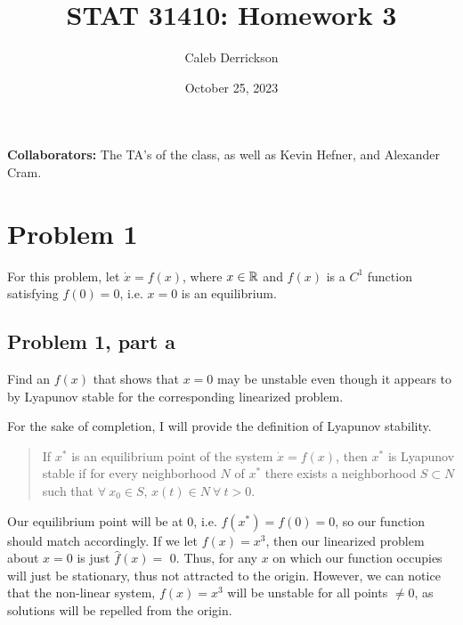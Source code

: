 

\title{STAT 31410: Homework 3}
\author{Caleb Derrickson}
\date{October 25, 2023}


\onehalfspacing
\maketitle

{\color{cit}\vspace{2mm}\noindent\textbf{Collaborators:}} The TA's of the class, as well as Kevin Hefner, and Alexander Cram.

\tableofcontents

\newpage
\section{Problem 1}
For this problem, let $\dot{x} = f(x)$, where $x \in \mathbb{R}$ and $f(x)$ is a $C^1$ function satisfying $f(0) = 0$, i.e. $x = 0$ is an equilibrium. 

\subsection{Problem 1, part a}
Find an $f(x)$ that shows that $x = 0$ may be unstable even though it appears to by Lyapunov stable for the corresponding linearized problem.

\partbreak
\begin{solution}

    For the sake of completion, I will provide the definition of Lyapunov stability.

    \alignbreak
    \vspace{-8mm}
    \begin{quote}
        If $x^*$ is an equilibrium point of the system $\dot{x} = f(x)$, then $x^*$ is Lyapunov stable if for every neighborhood $N$ of $x^*$ there exists a neighborhood $S\subset N$ such that $\forall \ x_0 \in S$, $x(t) \in N \ \forall \ t > 0$.   
    \end{quote}
    \vspace{-8mm}
    \alignbreak

    Our equilibrium point will be at 0, i.e. $f(x^*) = f(0) = 0$, so our function should match accordingly. If we let $f(x) = x^3$, then our linearized problem about $x = 0$ is just $\hat{f}(x) = $ 0. Thus, for any $x$ on which our function occupies will just be stationary, thus not attracted to the origin.
    However, we can notice that the non-linear system, $f(x) = x^3$ will be unstable for all points $\neq 0$, as solutions will be repelled from the origin. 
\end{solution}

